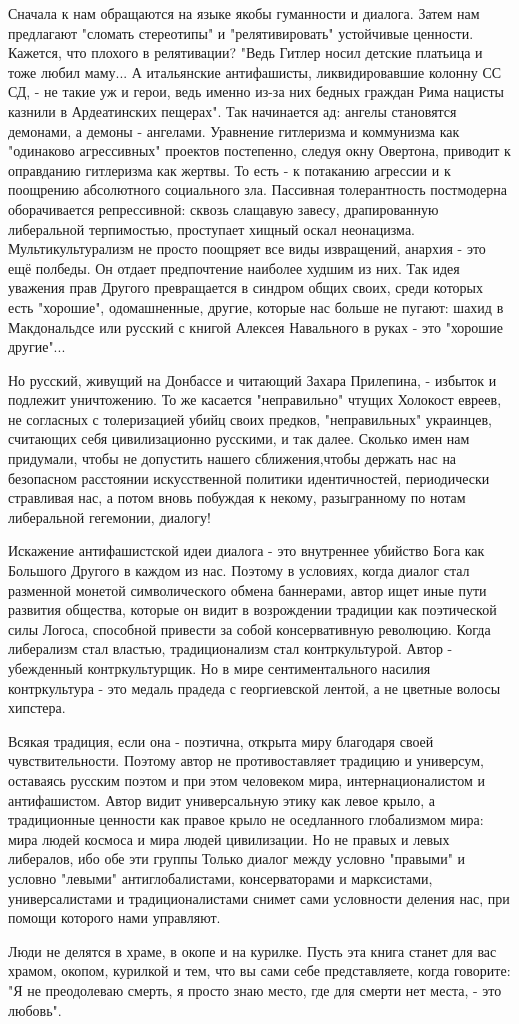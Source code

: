Сначала к нам обращаются на языке якобы гуманности и диалога. Затем нам
предлагают "сломать стереотипы" и "релятивировать" устойчивые ценности.
Кажется, что плохого в релятивации? "Ведь Гитлер носил детские платьица и тоже
любил маму... А итальянские антифашисты, ликвидировавшие колонну СС СД, - не
такие уж и герои, ведь именно из-за них бедных граждан Рима нацисты казнили в
Ардеатинских пещерах". Так начинается ад: ангелы становятся демонами, а демоны
- ангелами.  Уравнение гитлеризма и коммунизма как "одинаково агрессивных"
проектов постепенно, следуя окну Овертона, приводит к оправданию гитлеризма как
жертвы. То есть - к потаканию агрессии и к поощрению абсолютного социального
зла.  Пассивная толерантность постмодерна оборачивается репрессивной: сквозь
слащавую завесу, драпированную либеральной терпимостью, проступает хищный оскал
неонацизма. Мультикультурализм не просто поощряет все виды извращений, анархия
- это ещё полбеды. Он отдает предпочтение наиболее худшим из них. Так идея
уважения прав Другого превращается в синдром общих своих, среди которых есть
"хорошие", одомашненные, другие, которые нас больше не пугают: шахид в
Макдональдсе или русский с книгой Алексея Навального в руках - это "хорошие
другие"...

Но русский, живущий на Донбассе и читающий Захара Прилепина, - избыток и
подлежит уничтожению. То же касается "неправильно" чтущих Холокост евреев, не
согласных с толеризацией убийц своих предков, "неправильных" украинцев,
считающих себя цивилизационно русскими, и так далее. Сколько имен нам
придумали, чтобы не допустить нашего сближения,чтобы держать нас на безопасном
расстоянии искусственной политики идентичностей, периодически стравливая нас, а
потом вновь побуждая к некому, разыгранному по нотам либеральной гегемонии,
диалогу! 

Искажение антифашистской идеи диалога - это внутреннее убийство Бога как
Большого Другого в каждом из нас. Поэтому в условиях, когда диалог стал
разменной монетой символического обмена баннерами, автор ищет иные пути
развития общества, которые он видит в возрождении традиции как поэтической силы
Логоса, способной привести за собой консервативную революцию. Когда либерализм
стал властью, традиционализм стал контркультурой. Автор - убежденный
контркультурщик. Но в мире сентиментального насилия контркультура - это медаль
прадеда с георгиевской лентой, а не цветные волосы хипстера. 

Всякая традиция, если она - поэтична, открыта миру благодаря своей
чувствительности. Поэтому автор не противоставляет традицию и универсум,
оставаясь русским поэтом и при этом человеком мира, интернационалистом и
антифашистом. Автор видит универсальную этику как левое крыло, а традиционные
ценности как правое крыло не оседланного глобализмом мира: мира людей космоса и
мира людей цивилизации. Но не правых и левых либералов, ибо обе эти группы
Только диалог между условно "правыми" и условно  "левыми" антиглобалистами,
консерваторами и марксистами, универсалистами и традиционалистами снимет сами
условности деления нас, при помощи которого нами управляют. 

Люди не делятся в храме, в окопе и на курилке. Пусть эта книга станет для вас
храмом, окопом, курилкой и тем, что вы сами себе представляете, когда говорите:
"Я не преодолеваю смерть, я просто знаю место, где для смерти нет места, - это
любовь".

